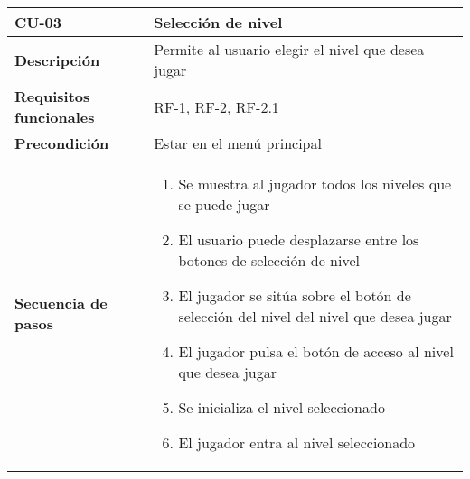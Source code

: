 \begin{tabularx}{\columnwidth}{l|l}
\begin{minipage}{0.25\columnwidth}
\textbf{CU-03} 
\end{minipage}
&
\begin{minipage}{0.65\columnwidth}
Selección de nivel
\end{minipage}
\\ \hline

\begin{minipage}{0.25\columnwidth}
\textbf{Descripción} 
\end{minipage}
&
\begin{minipage}{0.65\columnwidth}
Permite al usuario elegir el nivel que desea jugar
\end{minipage}
\\ \hline

\begin{minipage}{0.25\columnwidth}
\textbf{Requisitos funcionales} 
\end{minipage}
&
\begin{minipage}{0.65\columnwidth}
RF-1, RF-2, RF-2.1
\end{minipage}
\\ \hline

\begin{minipage}{0.25\columnwidth}
\textbf{Precondición} 
\end{minipage}
&
\begin{minipage}{0.65\columnwidth}
Estar en el menú principal
\end{minipage}
\\ \hline

\begin{minipage}{0.25\columnwidth}
\textbf{Secuencia de pasos} 
\end{minipage}
&
\begin{minipage}{0.65\columnwidth}
\begin{enumerate}
\item
Se muestra al jugador todos los niveles que se puede jugar
\item
El usuario puede desplazarse entre los botones de selección de nivel
\item
El jugador se sitúa sobre el botón de selección del nivel del nivel que desea jugar
\item
El jugador pulsa el botón de acceso al nivel que desea jugar
\item
Se inicializa el nivel seleccionado
\item
El jugador entra al nivel seleccionado
\end{enumerate}
\end{minipage}
\\ \hline


\end{tabularx}
